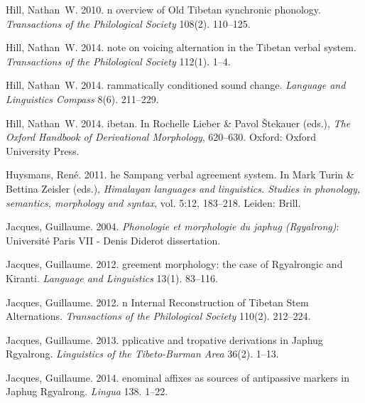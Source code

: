 \documentclass[oneside,a4paper,11pt]{article}
\begin{document}
\begin{thebibliography}{65}
Hill, Nathan~W. 2010.
n overview of {O}ld {T}ibetan synchronic phonology.
\newblock \emph{Transactions of the Philological Society} 108(2). 110--125.

Hill, Nathan~W. 2014{}.
 note on voicing alternation in the {T}ibetan verbal system.
\newblock \emph{Transactions of the Philological Society} 112(1). 1--4.

Hill, Nathan~W. 2014{}.
rammatically conditioned sound change.
\newblock \emph{Language and Linguistics Compass} 8(6). 211--229.

Hill, Nathan~W. 2014{}.
ibetan.
\newblock In Rochelle Lieber \& Pavol Štekauer (eds.), \emph{{T}he {O}xford
  {H}andbook of {D}erivational {M}orphology}, 620–630. Oxford: Oxford
  University Press.

Huysmans, René. 2011.
he {S}ampang verbal agreement system.
\newblock In Mark Turin \& Bettina Zeisler (eds.), \emph{{H}imalayan languages
  and linguistics. {S}tudies in phonology, semantics, morphology and syntax},
  vol. 5:12, 183--218. Leiden: Brill.

Jacques, Guillaume. 2004.
\newblock \emph{{P}honologie et morphologie du japhug ({R}gyalrong)}:
  Université Paris VII - Denis Diderot dissertation.

Jacques, Guillaume. 2012{}.
greement morphology: the case of {R}gyalrongic and {K}iranti.
\newblock \emph{Language and Linguistics} 13(1). 83--116.

Jacques, Guillaume. 2012{}.
n {I}nternal {R}econstruction of {T}ibetan {S}tem {A}lternations.
\newblock \emph{Transactions of the Philological Society} 110(2). 212–224.

Jacques, Guillaume. 2013.
pplicative and tropative derivations in {J}aphug {R}gyalrong.
\newblock \emph{Linguistics of the Tibeto-Burman Area} 36(2). 1--13.

Jacques, Guillaume. 2014{}.
enominal affixes as sources of antipassive markers in {J}aphug
  {R}gyalrong.
\newblock \emph{Lingua} 138. 1--22.


\end{thebibliography}
\end{document}
